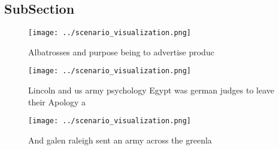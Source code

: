 \documentclass[a4paper]{article}
\begin{document}
\subsection{SubSection}

\begin{figure}
\centering
\texttt{[image: ../scenario\_visualization.png]}
\caption{Albatrosses and purpose being to advertise produc
}
\end{figure}
 
\begin{figure}
\centering
\texttt{[image: ../scenario\_visualization.png]}
\caption{Lincoln and us army psychology Egypt was german judges to leave their Apology a
}
\end{figure}
 
\begin{figure}
\centering
\texttt{[image: ../scenario\_visualization.png]}
\caption{And galen raleigh sent an army across the greenla
}
\end{figure}
 
\end{document}
